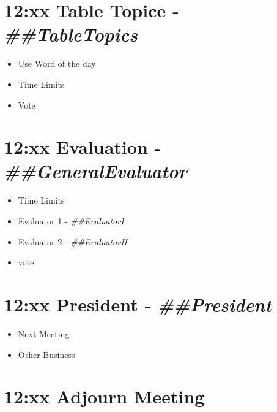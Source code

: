 \documentclass{article}
\newcommand{\president}{##President}
\newcommand{\tableTopics}{##TableTopics}
\newcommand{\generalEvaluator}{##GeneralEvaluator}
\newcommand{\evaluatorI}{##EvaluatorI}
\newcommand{\evaluatorII}{##EvaluatorII}
\begin{document}
\begin{spacing}{.6}
\section*{12:xx Table Topice - \textit{\tableTopics{}}} 
\begin{itemize}
 \item Use Word of the day
 \item Time Limits
 \item Vote
\end{itemize}

\section*{12:xx Evaluation - \textit{\generalEvaluator{}}} 
\begin{itemize}
  \item Time Limits
  \item Evaluator 1 - \textit{\evaluatorI{}}
  \item Evaluator 2 - \textit{\evaluatorII{}}
  \item vote
\end{itemize}

\section*{12:xx President - \textit{\president{}}} 
\begin{itemize}
  \item Next Meeting
  \item Other Business
\end{itemize}
\section*{12:xx Adjourn Meeting} 
\end{spacing}
\end{document}
